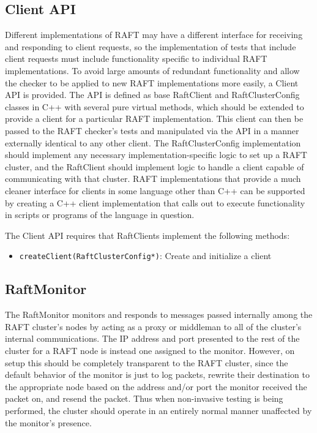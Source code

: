 \documentclass[UTF8]{article}
\begin{document}
\subsection{Client API}

Different implementations of RAFT may have a different interface for receiving and responding to client requests, so the implementation of tests that include client requests must include functionality specific to individual RAFT implementations. To avoid large amounts of redundant functionality and allow the checker to be applied to new RAFT implementations more easily, a Client API is provided. The API is defined as base RaftClient and RaftClusterConfig classes in C++ with several pure virtual methods, which should be extended to provide a client for a particular RAFT implementation. This client can then be passed to the RAFT checker's tests and manipulated via the API in a manner externally identical to any other client. The RaftClusterConfig implementation should implement any necessary implementation-specific logic to set up a RAFT cluster, and the RaftClient should implement logic to handle a client capable of communicating with that cluster. RAFT implementations that provide a much cleaner interface for clients in some language other than C++ can be supported by creating a C++ client implementation that calls out to execute functionality in scripts or programs of the language in question.

The Client API requires that RaftClients implement the following methods:

\begin{itemize}
\item \texttt{createClient(RaftClusterConfig*)}: Create and initialize a client  
\end{itemize}

\subsection{RaftMonitor}

The RaftMonitor monitors and responds to messages passed internally among the RAFT cluster's nodes by acting as a proxy or middleman to all of the cluster's internal communications. The IP address and port presented to the rest of the cluster for a RAFT node is instead one assigned to the monitor. However, on setup this should be completely transparent to the RAFT cluster, since the default behavior of the monitor is just to log packets, rewrite their destination to the appropriate node based on the address and/or port the monitor received the packet on, and resend the packet. Thus when non-invasive testing is being performed, the cluster should operate in an entirely normal manner unaffected by the monitor's presence.
\end{document}
